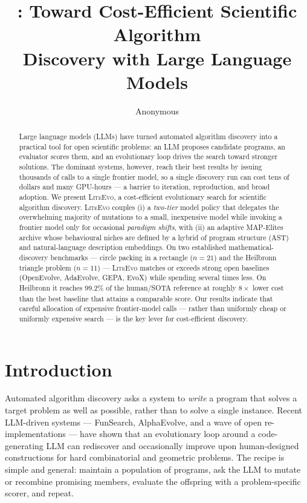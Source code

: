 \documentclass[10pt,twocolumn]{article}
\title{\liteevo: Toward Cost-Efficient Scientific Algorithm\\
       Discovery with Large Language Models}
\author{Anonymous}
\affil{\normalsize Under review}
\date{}
\newcommand{\liteevo}{\textsc{LiteEvo}}
\newcommand{\best}[1]{\textbf{#1}}
\begin{document}
\maketitle

\begin{abstract}
Large language models (LLMs) have turned automated algorithm discovery into a
practical tool for open scientific problems: an LLM proposes candidate
programs, an evaluator scores them, and an evolutionary loop drives the search
toward stronger solutions. The dominant systems, however, reach their best
results by issuing thousands of calls to a single frontier model, so a single
discovery run can cost tens of dollars and many GPU-hours --- a barrier to
iteration, reproduction, and broad adoption. We present \liteevo, a
cost-efficient evolutionary search for scientific algorithm discovery. \liteevo{}
couples (i) a \emph{two-tier} model policy that delegates the overwhelming
majority of mutations to a small, inexpensive model while invoking a frontier
model only for occasional \emph{paradigm shifts}, with (ii) an adaptive
MAP-Elites archive whose behavioural niches are defined by a hybrid of program
structure (AST) and natural-language description embeddings. On two
established mathematical-discovery benchmarks --- circle packing in a rectangle
($n{=}21$) and the Heilbronn triangle problem ($n{=}11$) --- \liteevo{} matches
or exceeds strong open baselines (OpenEvolve, AdaEvolve, GEPA, EvoX) while
spending several times less. On Heilbronn it reaches $99.2\%$ of the
human/SOTA reference at roughly \best{$8\times$} lower cost than the best
baseline that attains a comparable score. Our results indicate that careful
allocation of expensive frontier-model calls --- rather than uniformly cheap or
uniformly expensive search --- is the key lever for cost-efficient discovery.
\end{abstract}

\section{Introduction}
\label{sec:intro}

Automated algorithm discovery asks a system to \emph{write} a program that
solves a target problem as well as possible, rather than to solve a single
instance. Recent LLM-driven systems --- FunSearch, AlphaEvolve, and a wave of
open re-implementations --- have shown that an evolutionary loop around a
code-generating LLM can rediscover and occasionally improve upon
human-designed constructions for hard combinatorial and geometric problems.
The recipe is simple and general: maintain a population of programs, ask the
LLM to mutate or recombine promising members, evaluate the offspring with a
problem-specific scorer, and repeat.
\end{document}

